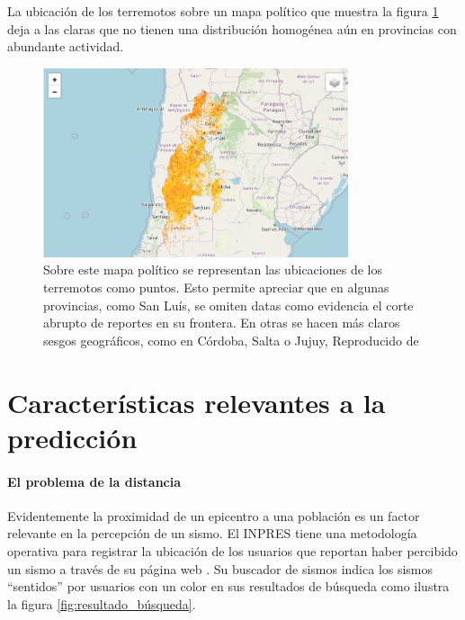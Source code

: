 \documentclass[a4paper]{report}
\begin{document}
La ubicación de los terremotos sobre un mapa político que muestra la figura \ref{fig:terremotosMapa} deja a las claras que no tienen una distribución homogénea aún en provincias con abundante actividad.
\begin{figure}[!h]
\centering
\includegraphics[width=0.8\textwidth]{terremotosMapa.png}
\caption{Sobre este mapa político se representan las ubicaciones de los terremotos como puntos. Esto permite apreciar que en algunas provincias, como San Luís, se omiten datas como evidencia el corte abrupto de reportes en su frontera. En otras se hacen más claros sesgos geográficos, como en Córdoba, Salta o Jujuy, 
Reproducido de \cite{daniela_parada_ic-datasets-docencia_nodate}}
\label{fig:terremotosMapa}
\end{figure}






\section{Características relevantes a la predicción}

\paragraph{El problema de la distancia}
Evidentemente la proximidad de un epicentro a una población es un factor relevante en la percepción de un sismo.
El INPRES tiene una metodología operativa para registrar la ubicación de los usuarios que reportan haber percibido un sismo a través de su página web \cite{noauthor_acerca_nodate}.
Su buscador de sismos indica los sismos ``sentidos'' por usuarios con un color en sus resultados de búsqueda como ilustra la figura \ref{fig:resultado_búsqueda}.
\end{document}
